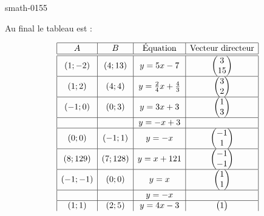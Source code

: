 \begin{corrige}{smath-0155}
\begin{enumerate}
    \end{enumerate}

    Au final le tableau est :

    \begin{equation*}
        \begin{array}[]{|c|c|c|c|}
            \hline
            A&B&\text{Équation}&\text{Vecteur directeur}\\
            \hline\hline
            (1;-2)&(4;13)&y=5x-7&\begin{pmatrix}
                3    \\ 
                15    
            \end{pmatrix}\\
            \hline
            (1;2)&(4;4)&y=\frac{ 2 }{ 4 }x+\frac{ 4 }{ 3 }&\begin{pmatrix}
                3    \\ 
                2    
            \end{pmatrix}\\
            \hline
            (-1;0)&(0;3)&y=3x+3&\begin{pmatrix}
                1    \\ 
                3    
            \end{pmatrix}\\
            \hline
            &&y=-x+3&\\
            \hline
            (0;0)&(-1;1)&y=-x&\begin{pmatrix}
                -1    \\ 
                1    
            \end{pmatrix}\\
            \hline
            (8;129)&(7;128)&y=x+121&\begin{pmatrix}
                -1    \\ 
                -1    
            \end{pmatrix}\\
            \hline
            (-1;-1)&(0;0)&y=x&\begin{pmatrix}
                1    \\ 
                1    
            \end{pmatrix}\\
            \hline
            &&y=-x&\\
            \hline
            (1;1)&(2;5)&y=4x-3&\begin{pmatrix}
                1    \\ 

\end{pmatrix}
\end{array}
\end{equation*}
\end{corrige}
